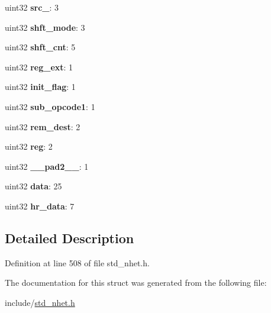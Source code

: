 \begin{DoxyCompactItemize}
\mbox{\label{structADC__format_a818af35cc68ec114e65ed45197768853}} 
uint32 {\bfseries src\+\_}\+: 3
\item 
\mbox{\label{structADC__format_a12584bb03799c9d982bf153197083271}} 
uint32 {\bfseries shft\+\_\+mode}\+: 3
\item 
\mbox{\label{structADC__format_a20da133a66b5a81d922335a32edec50b}} 
uint32 {\bfseries shft\+\_\+cnt}\+: 5
\item 
\mbox{\label{structADC__format_a7048e29cfa5b2d2125f2abdde2235c8a}} 
uint32 {\bfseries reg\+\_\+ext}\+: 1
\item 
\mbox{\label{structADC__format_a9d331d0c340d62df42c5882aacaf5f45}} 
uint32 {\bfseries init\+\_\+flag}\+: 1
\item 
\mbox{\label{structADC__format_aac5bcbe6cb59c49a0ddf4be6296bd14c}} 
uint32 {\bfseries sub\+\_\+opcode1}\+: 1
\item 
\mbox{\label{structADC__format_a02517c8c5028e42c2e0e23095c85843a}} 
uint32 {\bfseries rem\+\_\+dest}\+: 2
\item 
\mbox{\label{structADC__format_a3417eeee71c003a79ce788ac03be6d8c}} 
uint32 {\bfseries reg}\+: 2
\item 
\mbox{\label{structADC__format_ae0a881872b4e25ed30e4dc46d5d7ab0a}} 
uint32 {\bfseries \+\_\+\+\_\+pad2\+\_\+\+\_\+}\+: 1
\item 
\mbox{\label{structADC__format_a217e59dbe1b54c3260aed85c8a4a3f85}} 
uint32 {\bfseries data}\+: 25
\item 
\mbox{\label{structADC__format_a6aa73ebc4223e266b0d00f69a76ba7c0}} 
uint32 {\bfseries hr\+\_\+data}\+: 7
\end{DoxyCompactItemize}


\subsection{Detailed Description}


Definition at line 508 of file std\+\_\+nhet.\+h.



The documentation for this struct was generated from the following file\+:\begin{DoxyCompactItemize}
\item 
include/\mbox{\hyperlink{std__nhet_8h}{std\+\_\+nhet.\+h}}\end{DoxyCompactItemize}
